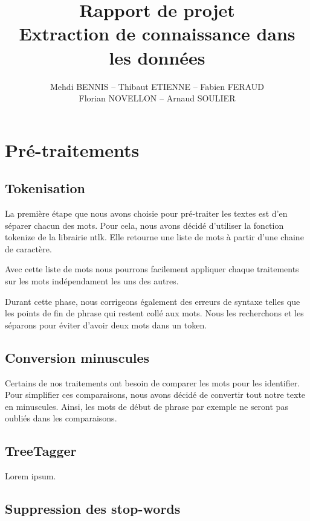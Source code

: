 \documentclass[a4paper]{report}
\title{Rapport de projet\\Extraction de connaissance dans les données}
\author{Mehdi BENNIS -- Thibaut ETIENNE -- Fabien FERAUD\\Florian NOVELLON -- Arnaud SOULIER}
\begin{document}
    \maketitle

    \newpage
    \null
    \newpage

    \tableofcontents

    \chapter{Pré-traitements}

        \section{Tokenisation}

            La première étape que nous avons choisie pour pré-traiter les textes est d'en séparer chacun des mots.
            Pour cela, nous avons décidé d'utiliser la fonction tokenize de la librairie ntlk. Elle retourne une liste de mots à partir d'une chaine de caractère.

            Avec cette liste de mots nous pourrons facilement appliquer chaque traitements sur les mots indépendament les uns des autres.

            Durant cette phase, nous corrigeons également des erreurs de syntaxe telles que les points de fin de phrase qui restent collé aux mots. Nous les recherchons et les séparons pour éviter d'avoir deux mots dans un token.

        \section{Conversion minuscules}

            Certains de nos traitements ont besoin de comparer les mots pour les identifier. Pour simplifier ces comparaisons, nous avons décidé de convertir tout notre texte en minuscules. Ainsi, les mots de début de phrase par exemple ne seront pas oubliés dans les comparaisons.

        \section{TreeTagger}

            Lorem ipsum.

        \section{Suppression des stop-words}
\end{document}
